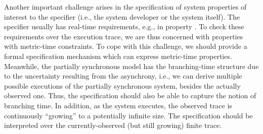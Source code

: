 \documentclass[10pt,conference,compsocconf,letterpaper]{IEEEtran}
\begin{document}
Another important challenge arises in the specification of system properties of interest to the specifier (i.e., the system developer or the system itself). The specifier usually has real-time requirements, e.g., in property . To check these requirements over the execution trace, we are thus concerned with properties with metric-time constraints. To cope with this challenge, we should provide a formal specification mechanism which can express metric-time properties. Meanwhile, the partially synchronous model has the branching-time structure due to the uncertainty resulting from the asynchrony, i.e., we can derive multiple possible executions of the partially synchronous system, besides the actually observed one. Thus, the specification should also be able to capture the notion of branching time. In addition, as the system executes, the observed trace is continuously ``growing'' to a potentially infinite size. The specification should be interpreted over the currently-observed (but still growing) finite trace.
\end{document}
